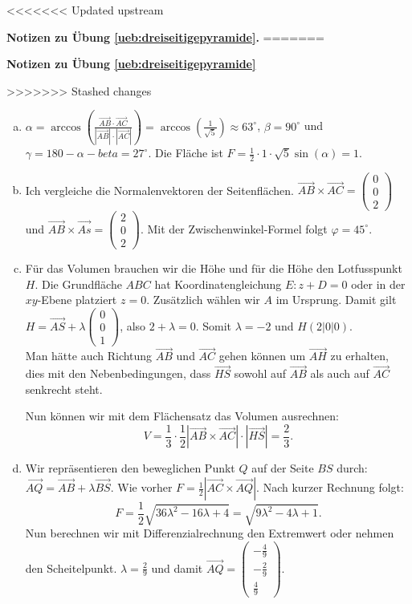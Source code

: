 \documentclass[%
11pt,%
twoside,%
titlepage,%
<<<<<<< Updated upstream
german,%
=======
swissgerman,%
>>>>>>> Stashed changes
headsepline%
]{scrartcl}
\newcommand{\faReturnGray}{\textcolor{gray}{\faMailReply}} %
\theoremstyle{definition}
\theoremstyle{plain}
\newcommand{\concatueb}[1]{ueb:#1}%
\newcommand{\concatlsg}[1]{lsg:#1}%
\newenvironment{lsg}[1]{%
<<<<<<< Updated upstream
    \par\noindent\textbf{Notizen zu Übung \ref{\concatueb{#1}}.}%
    \label{\concatlsg{#1}}
=======
    \par\noindent\textbf{Notizen zu Übung \ref{\concatueb{#1}}}\label{\concatlsg{#1}}
    \hfill\hyperref[\concatueb{#1}]{\faReturnGray}\par %
>>>>>>> Stashed changes
}{%
    \par%
}
\begin{document}
\begin{lsg}{dreiseitigepyramide}
    \begin{enumerate}[a)]
        \item $\alpha=\arccos\left(\frac{\vec{AB}\cdot\vec{AC}}{|\vec{AB}|\cdot|\vec{AC}|}\right)=\arccos(\frac{1}{\sqrt{5}})\approx63^\circ$, $\beta=90^\circ$ und $\gamma=180-\alpha-beta=27^\circ$. Die Fläche ist $F=\frac{1}{2}\cdot1\cdot\sqrt{5}\sin(\alpha)=1$.

        \item Ich vergleiche die Normalenvektoren der Seitenflächen. $\vec{AB}\times\vec{AC}=\begin{pmatrix}
            0\\0\\2
        \end{pmatrix}$ und $\vec{AB}\times\vec{As}=\begin{pmatrix}
            2\\0\\2
        \end{pmatrix}$. Mit der Zwischenwinkel-Formel folgt $\varphi=45^\circ$.

        \item Für das Volumen brauchen wir die Höhe und für die Höhe den Lotfusspunkt $H$. Die Grundfläche $ABC$ hat Koordinatengleichung $E:z+D=0$ oder in der $xy$-Ebene platziert $z=0$. Zusätzlich wählen wir $A$ im Ursprung. Damit gilt $H=\vec{AS}+\lambda\begin{pmatrix}
            0\\0\\1
        \end{pmatrix}$, also $2+\lambda=0$. Somit $\lambda=-2$ und $H(2|0|0)$.\\
        Man hätte auch Richtung $\vec{AB}$ und $\vec{AC}$ gehen können um $\vec{AH}$ zu erhalten, dies mit den Nebenbedingungen, dass $\vec{HS}$ sowohl auf $\vec{AB}$ als auch auf $\vec{AC}$ senkrecht steht.

        Nun können wir mit dem Flächensatz das Volumen ausrechnen:
        $$V=\frac{1}{3}\cdot\frac{1}{2}|\vec{AB}\times\vec{AC}|\cdot|\vec{HS}|=\frac{2}{3}.$$

        \item Wir repräsentieren den beweglichen Punkt $Q$ auf der Seite $BS$ durch: $\vec{AQ}=\vec{AB}+\lambda\vec{BS}$. Wie vorher $F=\frac{1}{2}|\vec{AC}\times\vec{AQ}|$. Nach kurzer Rechnung folgt:
        $$F=\frac{1}{2}\sqrt{36\lambda^2-16\lambda+4}=\sqrt{9\lambda^2-4\lambda+1}.$$
        Nun berechnen wir mit Differenzialrechnung den Extremwert oder nehmen den Scheitelpunkt. $\lambda=\frac{2}{9}$ und damit $\vec{AQ}=\begin{pmatrix}
            -\frac{4}{9}\\-\frac{2}{9}\\ \frac{4}{9}
        \end{pmatrix}$.
    \end{enumerate}
\end{lsg}
\end{document}
